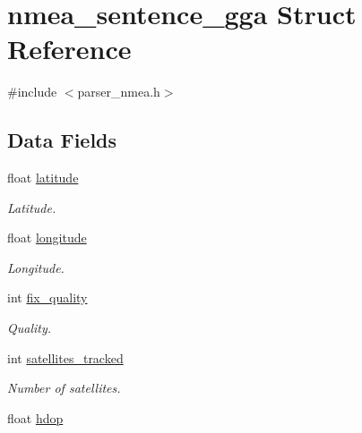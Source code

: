 \hypertarget{structnmea__sentence__gga}{}\section{nmea\+\_\+sentence\+\_\+gga Struct Reference}
\label{structnmea__sentence__gga}


{\ttfamily \#include $<$parser\+\_\+nmea.\+h$>$}

\subsection*{Data Fields}
\begin{DoxyCompactItemize}
\item 
float \hyperlink{structnmea__sentence__gga_ad9e643bc6bd5a62b9b5011cf1c93629e}{latitude}\hypertarget{structnmea__sentence__gga_ad9e643bc6bd5a62b9b5011cf1c93629e}{}\label{structnmea__sentence__gga_ad9e643bc6bd5a62b9b5011cf1c93629e}

\begin{DoxyCompactList}\small\item\em Latitude. \end{DoxyCompactList}\item 
float \hyperlink{structnmea__sentence__gga_a006303577d6adb772761727538b74f80}{longitude}\hypertarget{structnmea__sentence__gga_a006303577d6adb772761727538b74f80}{}\label{structnmea__sentence__gga_a006303577d6adb772761727538b74f80}

\begin{DoxyCompactList}\small\item\em Longitude. \end{DoxyCompactList}\item 
int \hyperlink{structnmea__sentence__gga_a06af219a391ab8458593450997c914a8}{fix\+\_\+quality}\hypertarget{structnmea__sentence__gga_a06af219a391ab8458593450997c914a8}{}\label{structnmea__sentence__gga_a06af219a391ab8458593450997c914a8}

\begin{DoxyCompactList}\small\item\em Quality. \end{DoxyCompactList}\item 
int \hyperlink{structnmea__sentence__gga_a0e612dc03ede36ead952cde344854888}{satellites\+\_\+tracked}\hypertarget{structnmea__sentence__gga_a0e612dc03ede36ead952cde344854888}{}\label{structnmea__sentence__gga_a0e612dc03ede36ead952cde344854888}

\begin{DoxyCompactList}\small\item\em Number of satellites. \end{DoxyCompactList}\item 
float \hyperlink{structnmea__sentence__gga_a8c3e6d0a80cec3520fd65b477f420415}{hdop}\hypertarget{structnmea__sentence__gga_a8c3e6d0a80cec3520fd65b477f420415}{}\label{structnmea__sentence__gga_a8c3e6d0a80cec3520fd65b477f420415}


\end{DoxyCompactItemize}
